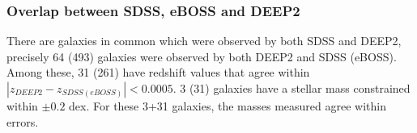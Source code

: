 \documentclass[onecolumn]{aa}
\begin{document}



\subsubsection{Overlap between SDSS, eBOSS and DEEP2}
There are galaxies in common which were observed by both SDSS and DEEP2, precisely 64 (493) galaxies were observed by both DEEP2 and SDSS (eBOSS). 
Among these, 31 (261) have redshift values that agree within $|z_{DEEP2}-z_{SDSS (eBOSS)}|<0.0005$. 
3 (31) galaxies have a stellar mass constrained within $\pm0.2$ dex. 
For these 3+31 galaxies, the masses measured agree within errors. 
\end{document}
